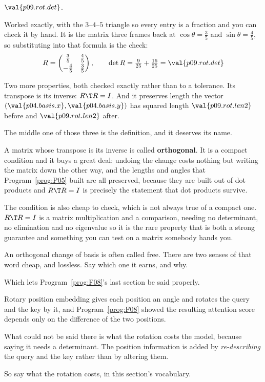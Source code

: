 \begin{fr}
\begin{ansblock}
$\val{p09.rot.det}$.
\end{ansblock}

Worked exactly, with the $3$--$4$--$5$ triangle so every entry is a fraction and
you can check it by hand. It is the matrix three frames back at
$\cos\theta = \tfrac{3}{5}$ and $\sin\theta = \tfrac{4}{5}$, so substituting
into that formula is the check:
\[ R = \begin{pmatrix} \tfrac{3}{5} & \tfrac{4}{5} \\[2pt]
                       -\tfrac{4}{5} & \tfrac{3}{5} \end{pmatrix},
   \qquad \det R = \tfrac{9}{25} + \tfrac{16}{25} = \val{p09.rot.det} \]

Two more properties, both checked exactly rather than to a tolerance. Its
transpose is its inverse: $R\T R = I$. And it preserves length \dash{} the
vector $(\val{p04.basis.x}, \val{p04.basis.y})$ has squared length
$\val{p09.rot.len2}$ before and $\val{p09.rot.len2}$ after.
\end{fr}

\begin{fr}
The middle one of those three is the definition, and it deserves its name.

A matrix whose transpose is its inverse is called \textbf{orthogonal}. It is a
compact condition and it buys a great deal: undoing the change costs nothing
but writing the matrix down the other way, and the lengths and angles that
Program~\ref{prog:P05} built are all preserved, because they are built out of
dot products and $R\T R = I$ is precisely the statement that dot products
survive.

The condition is also cheap to check, which is not always true of a compact
one. $R\T R = I$ is a matrix multiplication and a comparison, needing no
determinant, no elimination and no eigenvalue \dash{} so it is the rare
property that is both a strong guarantee and something you can test on a
matrix somebody hands you.

An orthogonal change of basis is often called free. There are two senses of
that word \dash{} cheap, and lossless. Say which one it earns, and why.
\dotline
\nextframe
\end{fr}

\begin{fr}
Which lets Program~\ref{prog:F08}'s last section be said properly.

Rotary position embedding gives each position an angle and rotates the query
and the key by it, and Program~\ref{prog:F08} showed the resulting attention
score depends only on the difference of the two positions.

What could not be said there is what the rotation costs the model, because
saying it needs a determinant. The position information is added by
\emph{re-describing} the query and the key rather than by altering them.

So say what the rotation costs, in this section's vocabulary.
\dotline
\nextframe
\end{fr}

